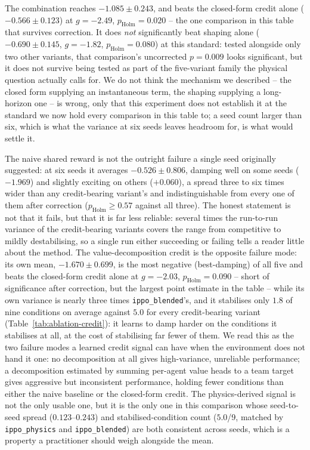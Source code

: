 \documentclass[preprint,11pt,authoryear]{elsarticle}
\begin{document}
The combination reaches $-1.085 \pm 0.243$, and beats the closed-form credit
alone ($-0.566\pm0.123$) at $g=-2.49$, $p_{\mathrm{Holm}}=0.020$ -- the one
comparison in this table that survives correction. It does \emph{not}
significantly beat shaping alone ($-0.690\pm0.145$, $g=-1.82$,
$p_{\mathrm{Holm}}=0.080$) at this standard: tested alongside only two other
variants, that comparison's uncorrected $p=0.009$ looks significant, but it
does not survive being tested as part of the five-variant family the physical
question actually calls for. We do not think the mechanism we described --
the closed form supplying an instantaneous term, the shaping supplying a
long-horizon one -- is wrong, only that this experiment does not establish it
at the standard we now hold every comparison in this table to; a seed count
larger than six, which is what the variance at six seeds leaves headroom for,
is what would settle it.

The naive shared reward is not the outright failure a single seed originally
suggested: at six seeds it averages $-0.526\pm0.806$, damping well on some
seeds ($-1.969$) and slightly exciting on others ($+0.060$), a spread three to
six times wider than any credit-bearing variant's and indistinguishable from
every one of them after correction ($p_{\mathrm{Holm}}\ge0.57$ against all
three). The honest statement is not that it fails, but that it is far less
reliable: several times the run-to-run variance of the credit-bearing variants
covers the range from competitive to mildly destabilising, so a single run
either succeeding or failing tells a reader little about the method. The
value-decomposition credit is the opposite failure mode: its own mean,
$-1.670\pm0.699$, is the most negative (best-damping) of all five and beats the
closed-form credit alone at $g=-2.03$, $p_{\mathrm{Holm}}=0.090$ -- short of
significance after correction, but the largest point estimate in the table --
while its own variance is nearly three times \texttt{ippo\_blended}'s, and it
stabilises only $1.8$ of nine conditions on average against $5.0$ for every
credit-bearing variant (Table~\ref{tab:ablation-credit}): it learns to damp
harder on the conditions it stabilises at all, at the cost of stabilising far
fewer of them. We read this as the two failure modes a learned credit signal
can have when the environment does not hand it one: no decomposition at all
gives high-variance, unreliable performance; a decomposition estimated by
summing per-agent value heads to a team target gives aggressive but
inconsistent performance, holding fewer conditions than either the naive
baseline or the closed-form credit. The physics-derived signal is not the only
usable one, but it is the only one in this comparison whose seed-to-seed
spread ($0.123$--$0.243$) and stabilised-condition count ($5.0$/9, matched by
\texttt{ippo\_physics} and \texttt{ippo\_blended}) are both consistent across
seeds, which is a property a practitioner should weigh alongside the mean.
\end{document}
